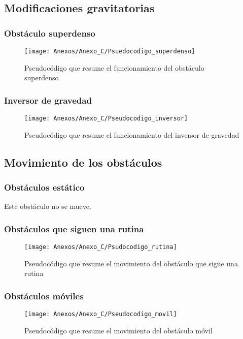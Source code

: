 \subsection{Modificaciones gravitatorias}
\subsubsection{Obstáculo superdenso}

\begin{figure}[h]
\centering
\texttt{[image: Anexos/Anexo\_C/Psuedocodigo\_superdenso]}
\caption{Pseudocódigo que resume el funcionamiento del obstáculo superdenso}
\end{figure}

\subsubsection{Inversor de gravedad}

\begin{figure}[h]
\centering
\texttt{[image: Anexos/Anexo\_C/Pseudocodigo\_inversor]}
\caption{Pseudocódigo que resume el funcionamiento del inversor de gravedad}
\end{figure}

\subsection{Movimiento de los obstáculos}
\subsubsection{Obstáculos estático}
Este obstáculo no se mueve.

\clearpage
\subsubsection{Obstáculos que siguen una rutina}

\begin{figure}[h]
\centering
\texttt{[image: Anexos/Anexo\_C/Psudocodigo\_rutina]}
\caption{Pseudocódigo que resume el movimiento del obstáculo que sigue una rutina}
\end{figure}

\subsubsection{Obstáculos móviles}

\begin{figure}[h]
\centering
\texttt{[image: Anexos/Anexo\_C/Pseudocodigo\_movil]}
\caption{Pseudocódigo que resume el movimiento del obstáculo móvil}
\end{figure}

